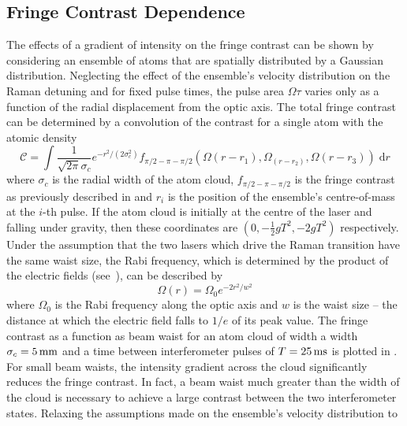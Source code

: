 \subsection{Fringe Contrast Dependence}\label{subsec:fringe_contrast}

The effects of a gradient of intensity on the fringe contrast can be shown by
considering an ensemble of atoms that are spatially distributed by a Gaussian
distribution. Neglecting the effect of the ensemble's velocity distribution
on the Raman detuning and for fixed pulse times, the pulse area \(\Omega
\tau\) varies only as a function of the radial displacement from the optic
axis. The total fringe contrast can be determined by a convolution of the
contrast for a single atom with the atomic density
\begin{equation}
	\mathcal{C} = \int \frac{1}{\sqrt{2\pi}\sigma_c}e^{-r^2/(2\sigma_c^2)} f_{\pi/2-\pi-\pi/2}\left(\Omega(r-r_1),\Omega_(r-r_2),\Omega(r-r_3)\right) \;\mathrm{d}r
	\label{eq:cloud_contrast}
\end{equation}
where \(\sigma_c\) is the radial width of the atom cloud,
\(f_{\pi/2-\pi-\pi/2}\) is the fringe contrast as previously described in
 and \(r_i\) is the position of the
ensemble's centre-of-mass at the \(i\)-th pulse. If the atom cloud is
initially at the centre of the laser and falling under gravity, then these
coordinates are \(\left(0, -\frac{1}{2}g T^2, -2 g T^2\right)\) respectively.
Under the assumption that the two lasers which drive the Raman transition
have the same waist size, the Rabi frequency, which is determined by the
product of the electric fields (see~), can be
described by
\begin{equation}
	\Omega(r) = \Omega_0 e^{-2 r^2/w^2}
\end{equation}
where \(\Omega_0\) is the Rabi frequency along the optic axis and \(w\) is
the waist size -- the distance at which the electric field falls to \(1/e\)
of its peak value. The fringe contrast as a function as beam waist for an
atom cloud of width a width \(\sigma_c = \sivalue{5}{\milli\metre}\) and a
time between interferometer pulses of \(T = \sivalue{25}{\milli\second}\) is
plotted in . For small beam waists, the
intensity gradient across the cloud significantly reduces the fringe
contrast. In fact, a beam waist much greater than the width of the cloud is
necessary to achieve a large contrast between the two interferometer states.
Relaxing the assumptions made on the ensemble's velocity distribution to

